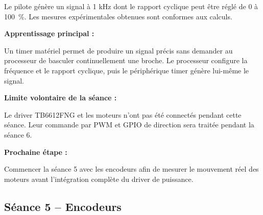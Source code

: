 \documentclass[11pt,a4paper]{article}
\begin{document}
\begin{sessionbox}
		Le pilote génère un signal à 1 kHz dont le rapport cyclique peut être réglé de 0 à 100~\%. Les mesures expérimentales obtenues sont conformes aux calculs.
		
		\vspace{0.3cm}
		
		\textbf{Apprentissage principal :}
		
		Un timer matériel permet de produire un signal précis sans demander au processeur de basculer continuellement une broche. Le processeur configure la fréquence et le rapport cyclique, puis le périphérique timer génère lui-même le signal.
		
		\vspace{0.3cm}
		
		\textbf{Limite volontaire de la séance :}
		
		Le driver TB6612FNG et les moteurs n'ont pas été connectés pendant cette séance. Leur commande par PWM et GPIO de direction sera traitée pendant la séance 6.
		
		\vspace{0.3cm}
		
		\textbf{Prochaine étape :}
		
		Commencer la séance 5 avec les encodeurs afin de mesurer le mouvement réel des moteurs avant l'intégration complète du driver de puissance.
		
	\end{sessionbox}
	\subsection*{Séance 5 -- Encodeurs}
	
\end{document}
